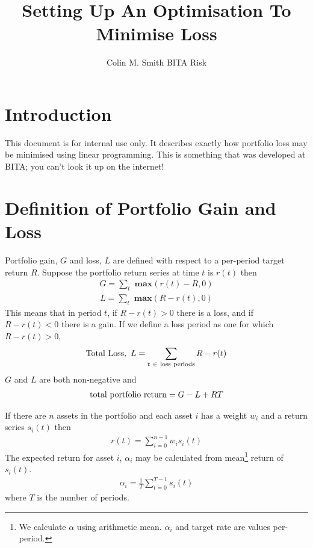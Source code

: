 \documentclass[12pt]{article}
\title{Setting Up An Optimisation To Minimise Loss}
\author{Colin M. Smith BITA Risk}
\begin{document}
\maketitle
\tableofcontents
\pagebreak
\doublespacing
\section{Introduction}
This document is for internal use only. It describes exactly how portfolio loss may be minimised
using linear programming. This is something that was developed at BITA; you can't look it up on the internet!
\section{Definition of Portfolio Gain and Loss}
Portfolio gain, $G$ and loss, $L$ are defined with respect to a per-period target return $R$. Suppose the portfolio return
series at time $t$ is $r(t)$ then
\begin{eqnarray}
    G = \sum_t {\textbf{ max} }(r(t) - R,0)
\end{eqnarray}
\begin{eqnarray}
    L = \sum_t {\textbf{ max} }(R-r(t),0)
\end{eqnarray}
This means that in period $t$, if $R-r(t) > 0$ there is a loss, and if $R-r(t) < 0$ there is a gain.
If we define a loss period as one for which $R-r(t) > 0$,
\begin{eqnarray}
  {\rm Total\ Loss},\ L= \sum_{t\ \in\ \rm loss\ periods} R-r(t)
\end{eqnarray}
$G$ and $L$ are both non-negative and
\begin{eqnarray}
 {\rm   total\ portfolio\ return}= G - L + RT
\end{eqnarray}

If there are $n$ assets in the portfolio and each asset $i$
has a weight $w_i$ and a return series $s_i (t)$ then
\begin{eqnarray}
    r(t) = \sum_{i=0}^{n-1} w_i s_i(t)
\end{eqnarray}
The expected return for asset $i$, $\alpha_i$ may be calculated from
mean\footnote{We calculate $\alpha$ using arithmetic mean. $\alpha_i$ and target rate are values per-period.} 
return of $s_i(t)$.
\begin{eqnarray}
    \alpha_i =  \frac{1}{T}\sum_{t=0}^{T-1} s_i(t)
\end{eqnarray}
where $T$ is the number of periods.
\end{document}
